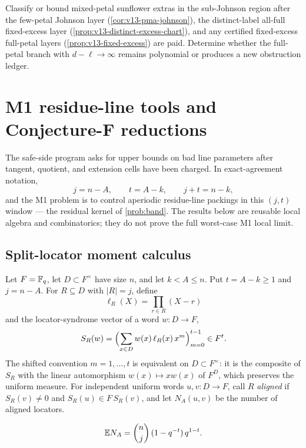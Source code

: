 \begin{problem}\label{prob:v13-l1-residuals}
Classify or bound mixed-petal sunflower extras in the sub-Johnson region after the few-petal Johnson layer \textup(\cref{cor:v13-pma-johnson}\textup), the distinct-label all-full fixed-excess layer \textup(\cref{prop:v13-distinct-excess-chart}\textup), and any certified fixed-excess full-petal layers \textup(\cref{prop:v13-fixed-excess}\textup) are paid.  Determine whether the full-petal branch with $d-\ell\to\infty$ remains polynomial or produces a new obstruction ledger.
\end{problem}

\section{M1 residue-line tools and Conjecture-F reductions}\label{sec:v13-m1}

The safe-side program asks for upper bounds on bad line parameters after tangent, quotient, and extension cells have been charged.  In exact-agreement notation,
\[
        j=n-A,
        \qquad
        t=A-k,
        \qquad
        j+t=n-k,
\]
and the M1 problem is to control aperiodic residue-line packings in this $(j,t)$ window --- the residual kernel of \cref{prob:band}.  The results below are reusable local algebra and combinatorics; they do not prove the full worst-case M1 local limit.

\subsection{Split-locator moment calculus}

Let $F=\mathbb F_q$, let $D\subset F^\times$ have size $n$, and let $k<A\le n$.  Put $t=A-k\ge1$ and $j=n-A$.  For $R\subseteq D$ with $|R|=j$, define
\[
        \ell_R(X)=\prod_{r\in R}(X-r)
\]
and the locator-syndrome vector of a word $w:D\to F$,
\[
        S_R(w)=
        \Bigl(\sum_{x\in D}w(x)\,\ell_R(x)\,x^m\Bigr)_{m=0}^{t-1}
        \in F^t .
\]
The shifted convention $m=1,\ldots,t$ is equivalent on $D\subset F^\times$: it is the composite of $S_R$ with the linear automorphism $w(x)\mapsto xw(x)$ of $F^D$, which preserves the uniform measure.  For independent uniform words $u,v:D\to F$, call $R$ \emph{aligned} if $S_R(v)\ne0$ and $S_R(u)\in F\,S_R(v)$, and let $N_A(u,v)$ be the number of aligned locators.

\begin{theorem}\label{thm:v13-first-moment}
\[
        \mathbb E N_A
        =
        \binom{n}{j}\,(1-q^{-t})\,q^{1-t}.
\]
\end{theorem}

